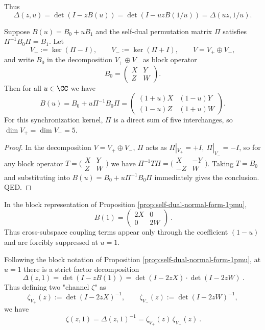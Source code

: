 Thus
\[
\Delta(z,u)=\det(I-zB(u))=\det(I-uzB(1/u))=\Delta(uz,1/u).
\]

\begin{proposition}\label{prop:self-dual-normal-form-1pmu}
Suppose \(B(u)=B_0+uB_1\) and the self-dual permutation matrix \(\Pi\) satisfies \(\Pi^{-1}B_0\Pi=B_1\).
Let
\[
V_+:=\ker(\Pi-I),\qquad V_-:=\ker(\Pi+I),
\qquad V=V_+\oplus V_-,
\]
and write \(B_0\) in the decomposition \(V_+\oplus V_-\) as block operator
\[
B_0=
\begin{pmatrix}
X & Y\\
Z & W
\end{pmatrix}.
\]
Then for all \(u\in\CC\) we have
\[
\boxed{
B(u)=B_0+u\Pi^{-1}B_0\Pi
=
\begin{pmatrix}
(1+u)X & (1-u)Y\\
(1-u)Z & (1+u)W
\end{pmatrix}.
}
\]
For this synchronization kernel, \(\Pi\) is a direct sum of five interchanges, so \(\dim V_+=\dim V_-=5\).
\end{proposition}
\begin{proof}
In the decomposition \(V=V_+\oplus V_-\), \(\Pi\) acts as \(\Pi|_{V_+}=+I,\ \Pi|_{V_-}=-I\), so for any block operator \(T=\bigl(\begin{smallmatrix}X&Y\\ Z&W\end{smallmatrix}\bigr)\) we have
\(
\Pi^{-1}T\Pi=\bigl(\begin{smallmatrix}X&-Y\\ -Z&W\end{smallmatrix}\bigr)
\).
Taking \(T=B_0\) and substituting into \(B(u)=B_0+u\Pi^{-1}B_0\Pi\) immediately gives the conclusion. QED.
\end{proof}

\begin{corollary}[\texorpdfstring{$u=1$}{u=1} Forced Decoupling]\label{cor:self-dual-u1-decouple}
In the block representation of Proposition \ref{prop:self-dual-normal-form-1pmu},
\[
\boxed{\ B(1)=
\begin{pmatrix}
2X & 0\\
0 & 2W
\end{pmatrix}\ }.
\]
Thus cross-subspace coupling terms appear only through the coefficient \((1-u)\) and are forcibly suppressed at \(u=1\).
\end{corollary}

\begin{corollary}[\texorpdfstring{$u=1$}{u=1} Two-Channel \texorpdfstring{$\Delta/\zeta$}{Delta/zeta} Factorization]\label{cor:self-dual-u1-two-channel-zeta}
Following the block notation of Proposition \ref{prop:self-dual-normal-form-1pmu}, at \(u=1\) there is a strict factor decomposition
\[
\boxed{\ \Delta(z,1)=\det(I-zB(1))=\det(I-2zX)\cdot\det(I-2zW)\ }.
\]
Thus defining two "channel \(\zeta\)" as
\[
\zeta_{V_+}(z):=\det(I-2zX)^{-1},\qquad
\zeta_{V_-}(z):=\det(I-2zW)^{-1},
\]
we have
\[
\boxed{\ \zeta(z,1)=\Delta(z,1)^{-1}=\zeta_{V_+}(z)\,\zeta_{V_-}(z)\ }.
\]
\end{corollary}

